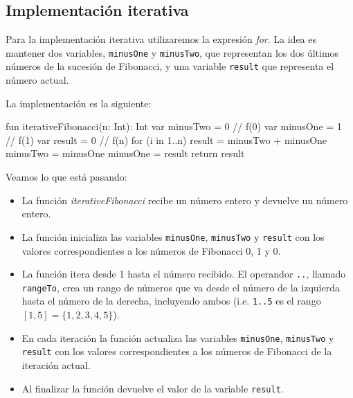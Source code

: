 \subsection{Implementación iterativa}
  \label{subsec:Implementacion_iterativa}

  Para la implementación iterativa utilizaremos la expresión \textit{for}.
  La idea es mantener dos variables, \texttt{minusOne} y \texttt{minusTwo}, que representan los dos 
  últimos números de la sucesión de Fibonacci, y una variable \texttt{result} que representa el 
  número actual.

  La implementación es la siguiente:
  \begin{kotlin}
    fun iterativeFibonacci(n: Int): Int {
      var minusTwo = 0  // f(0)
      var minusOne = 1  // f(1)
      var result = 0    // f(n)
      for (i in 1..n) {
        result = minusTwo + minusOne
        minusTwo = minusOne
        minusOne = result
      }
      return result
    }
  \end{kotlin}

  Veamos lo que está pasando:

  \begin{itemize}
    \item La función \textit{iterativeFibonacci} recibe un número entero y devuelve un número 
      entero.
    \item La función inicializa las variables \texttt{minusOne}, \texttt{minusTwo} y \texttt{result} 
      con los valores correspondientes a los números de Fibonacci 0, 1 y 0.
    \item La función itera desde 1 hasta el número recibido. 
      El operandor \texttt{..}, llamado \texttt{rangeTo}, crea un rango de números que va desde el 
      número de la izquierda hasta el número de la derecha, incluyendo ambos (i.e. \texttt{1..5} es 
      el rango \([1, 5] = \{1, 2, 3, 4, 5\}\)).
    \item En cada iteración la función actualiza las variables \texttt{minusOne}, \texttt{minusTwo} y 
      \texttt{result} con los valores correspondientes a los números de Fibonacci de la iteración 
      actual.
    \item Al finalizar la función devuelve el valor de la variable \texttt{result}.
  \end{itemize}